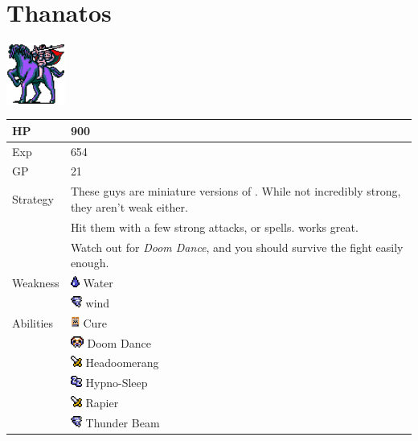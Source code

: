 \section{Thanatos}
\label{monster:thanatos}

\includegraphics[height=2cm,keepaspectratio]{./resources/monster/thanatos}

\begin{longtable}{ l p{9cm} }
	HP
	& 900
\\ \hline
	Exp
	& 654
\\ \hline
	GP
	& 21
\\ \hline
	Strategy
	& These guys are miniature versions of \nameref{monster:dullahan}. While not incredibly strong, they aren't weak either. \\
	& Hit them with a few strong attacks, or spells. \nameref{spell:meteor} works great. \\
	& Watch out for \textit{Doom Dance}, and you should survive the fight easily enough.
\\ \hline
	Weakness
	& \includegraphics[height=1em,keepaspectratio]{./resources/effects/water} Water \\
	& \includegraphics[height=1em,keepaspectratio]{./resources/effects/wind} wind
\\ \hline
	Abilities
	& \includegraphics[height=1em,keepaspectratio]{./resources/spells/cure} Cure \\
	& \includegraphics[height=1em,keepaspectratio]{./resources/effects/fatal} Doom Dance \\
	& \includegraphics[height=1em,keepaspectratio]{./resources/effects/damage} Headoomerang \\
	& \includegraphics[height=1em,keepaspectratio]{./resources/effects/sleep} Hypno-Sleep \\
	& \includegraphics[height=1em,keepaspectratio]{./resources/effects/damage} Rapier \\
	& \includegraphics[height=1em,keepaspectratio]{./resources/effects/wind} Thunder Beam
\end{longtable}
